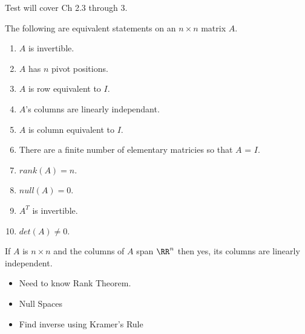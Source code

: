 Test will cover Ch 2.3 through 3.

The following are equivalent statements on an $n\times n$ matrix $A$.
\begin{enumerate}
\item $A$ is invertible.
\item $A$ has $n$ pivot positions.
\item $A$ is row equivalent to $I$.
\item $A$'s columns are linearly independant.
\item $A$ is column equivalent to $I$.
\item There are a finite number of elementary matricies so that $A$ = $I$.
\item $rank(A)=n$.
\item $null(A)=0$.
\item $A^T$ is invertible.
\item $det(A) \neq 0$.
\end{enumerate}
If $A$ is $n\times n$ and the columns of $A$ span $\RR^n$ then yes, its columns are linearly independent.
\begin{itemize}
\item Need to know Rank Theorem.
\item Null Spaces
\item Find inverse using Kramer's Rule
\end{itemize}


